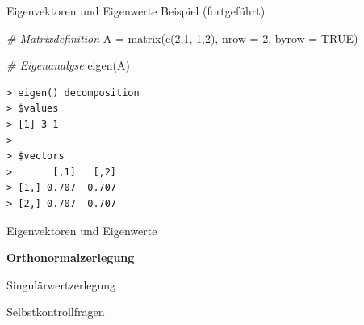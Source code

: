 \documentclass[
  8pt,
  ignorenonframetext,
]{beamer}
\newenvironment{Shaded}{\begin{snugshade}}{\end{snugshade}}
\newcommand{\AttributeTok}[1]{\textcolor[rgb]{0.77,0.63,0.00}{#1}}
\newcommand{\CommentTok}[1]{\textcolor[rgb]{0.56,0.35,0.01}{\textit{#1}}}
\newcommand{\ConstantTok}[1]{\textcolor[rgb]{0.00,0.00,0.00}{#1}}
\newcommand{\DecValTok}[1]{\textcolor[rgb]{0.00,0.00,0.81}{#1}}
\newcommand{\FunctionTok}[1]{\textcolor[rgb]{0.00,0.00,0.00}{#1}}
\newcommand{\NormalTok}[1]{#1}
\newcommand{\OtherTok}[1]{\textcolor[rgb]{0.56,0.35,0.01}{#1}}
\begin{document}
\begin{frame}[fragile]{Eigenvektoren und Eigenwerte}
\protect\hypertarget{eigenvektoren-und-eigenwerte-7}{}
Beispiel (fortgeführt) \vspace{3mm} \footnotesize

\begin{Shaded}
\begin{Highlighting}[]
\CommentTok{\# Matrixdefinition}
\NormalTok{A }\OtherTok{=} \FunctionTok{matrix}\NormalTok{(}\FunctionTok{c}\NormalTok{(}\DecValTok{2}\NormalTok{,}\DecValTok{1}\NormalTok{,}
             \DecValTok{1}\NormalTok{,}\DecValTok{2}\NormalTok{),}
           \AttributeTok{nrow  =} \DecValTok{2}\NormalTok{,}
           \AttributeTok{byrow =} \ConstantTok{TRUE}\NormalTok{)}

\CommentTok{\# Eigenanalyse}
\FunctionTok{eigen}\NormalTok{(A)}
\end{Highlighting}
\end{Shaded}

\begin{verbatim}
> eigen() decomposition
> $values
> [1] 3 1
> 
> $vectors
>       [,1]   [,2]
> [1,] 0.707 -0.707
> [2,] 0.707  0.707
\end{verbatim}
\end{frame}

\begin{frame}{}
\protect\hypertarget{section-4}{}
\vfill
{}
\Large

Eigenvektoren und Eigenwerte

\textbf{Orthonormalzerlegung}

Singulärwertzerlegung

Selbstkontrollfragen \vfill 
\end{frame}
\end{document}
